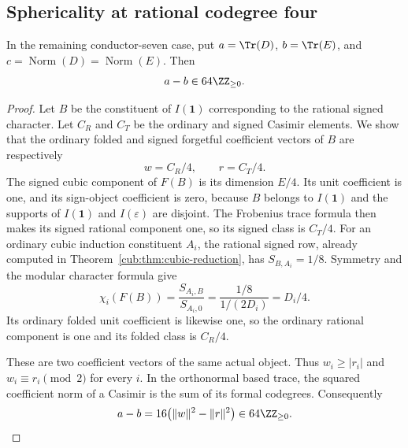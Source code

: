 \subsection{Sphericality at rational codegree four}

\begin{lemma}\label{cub:lem:cubic-four-trace-gap}
In the remaining conductor-seven case, put
$a=\Tr(D)$, $b=\Tr(E)$, and $c=\operatorname{Norm}(D)
=\operatorname{Norm}(E)$. Then
\[
 a-b\in64\ZZ_{\ge0}.
\]
\end{lemma}
\begin{proof}
Let $B$ be the constituent of $I(\mathbf1)$ corresponding to the
rational signed character. Let $C_R$ and $C_T$ be the ordinary and
signed Casimir elements. We show that the ordinary folded and signed
forgetful coefficient vectors of $B$ are respectively
\[
 w=C_R/4,\qquad r=C_T/4.
\]
The signed cubic component of $F(B)$ is its dimension $E/4$.
Its unit coefficient is one, and its sign-object coefficient is zero,
because $B$ belongs to $I(\mathbf1)$ and the supports of $I(\mathbf1)$
and $I(\varepsilon)$ are disjoint. The Frobenius trace formula then
makes its signed rational component one, so its signed class is $C_T/4$.
For an ordinary cubic induction constituent $A_i$, the rational signed
row, already computed in Theorem~\ref{cub:thm:cubic-reduction},
has $S_{B,A_i}=1/8$. Symmetry and the modular character formula give
\[
 \chi_i(F(B))=\frac{S_{A_i,B}}{S_{A_i,0}}
             =\frac{1/8}{1/(2D_i)}=D_i/4.
\]
Its ordinary folded unit coefficient is likewise one, so the ordinary
rational component is one and its folded class is $C_R/4$.

These are two coefficient vectors of the same actual object. Thus
$w_i\ge|r_i|$ and $w_i\equiv r_i\pmod2$ for every $i$. In the
orthonormal based trace, the squared coefficient norm of a Casimir is
the sum of its formal codegrees. Consequently
\[
 a-b=16\bigl(\|w\|^2-\|r\|^2\bigr)\in64\ZZ_{\ge0}.
\]
\end{proof}

